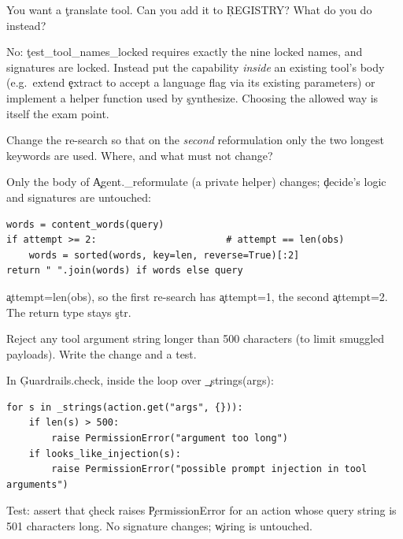 \begin{problem}
You want a \c{translate} tool. Can you add it to \c{REGISTRY}? What do you do instead?
\end{problem}
\begin{solution}
No: \c{test\_tool\_names\_locked} requires exactly the nine locked names, and signatures are locked. Instead put the capability \emph{inside} an existing tool's body (e.g.\ extend \c{extract} to accept a language flag via its existing parameters) or implement a helper function used by \c{synthesize}. Choosing the allowed way is itself the exam point.
\end{solution}

\begin{problem}
Change the re-search so that on the \emph{second} reformulation only the two longest keywords are used. Where, and what must not change?
\end{problem}
\begin{solution}
Only the body of \c{Agent.\_reformulate} (a private helper) changes; \c{decide}'s logic and signatures are untouched:
\begin{lstlisting}
words = content_words(query)
if attempt >= 2:                       # attempt == len(obs)
    words = sorted(words, key=len, reverse=True)[:2]
return " ".join(words) if words else query
\end{lstlisting}
\c{attempt=len(obs)}, so the first re-search has \c{attempt=1}, the second \c{attempt=2}. The return type stays \c{str}.
\end{solution}

\begin{problem}
Reject any tool argument string longer than 500 characters (to limit smuggled payloads). Write the change and a test.
\end{problem}
\begin{solution}
In \c{Guardrails.check}, inside the loop over \c{\_strings(args)}:
\begin{lstlisting}
for s in _strings(action.get("args", {})):
    if len(s) > 500:
        raise PermissionError("argument too long")
    if looks_like_injection(s):
        raise PermissionError("possible prompt injection in tool arguments")
\end{lstlisting}
Test: assert that \c{check} raises \c{PermissionError} for an action whose query string is 501 characters long. No signature changes; \c{wiring} is untouched.
\end{solution}

